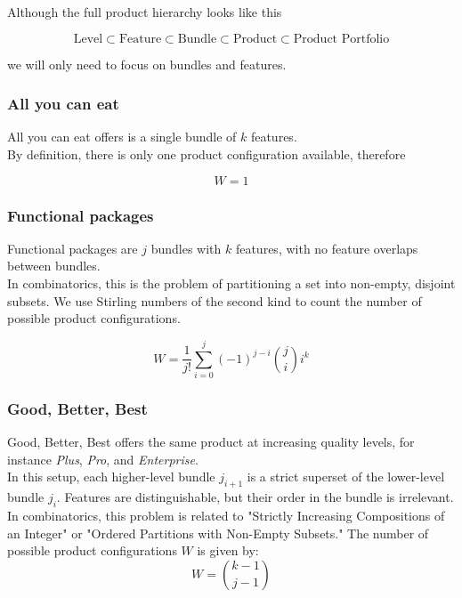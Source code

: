 \documentclass{article}
\begin{document}
Although the full product hierarchy looks like this

\[
\text{Level} \subset \text{Feature} \subset \text{Bundle} \subset \text{Product} \subset \text{Product Portfolio}
\]

we will only need to focus on bundles and features.

\subsubsection{All you can eat}

All you can eat offers is a single bundle of $k$ features. \\

By definition, there is only one product configuration available, therefore

\[
W = 1
\]


\subsubsection{Functional packages}

Functional packages are $j$ bundles with $k$ features, with no feature overlaps between bundles. \\

In combinatorics, this is the problem of partitioning a set into non-empty, disjoint subsets. We use Stirling numbers of the second kind to count the number of possible product configurations. 

\[
W = \frac{1}{j!} \sum_{i=0}^{j} (-1)^{j-i} \binom{j}{i} i^k
\]



\subsubsection{Good, Better, Best}

Good, Better, Best offers the same product at increasing quality levels, for instance \textit{Plus}, \textit{Pro}, and \textit{Enterprise}. \\

In this setup, each higher-level bundle \( j_{i+1} \) is a strict superset of the lower-level bundle \( j_i \). Features are distinguishable, but their order in the bundle is irrelevant. \\

In combinatorics, this problem is related to "Strictly Increasing Compositions of an Integer" or "Ordered Partitions with Non-Empty Subsets." The number of possible product configurations \( W \) is given by:
\[
W = \binom{k-1}{j-1}
\]
\end{document}
